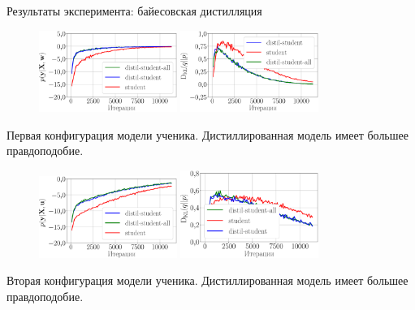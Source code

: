 \documentclass[10pt,pdf,hyperref={unicode}]{beamer}
\begin{document}
\begin{frame}{Результаты эксперимента: байесовская дистилляция}

\begin{figure}[h!]
\includegraphics[width=0.4\textwidth]{figures/synthetic_likelihood_3_layers.eps}
\includegraphics[width=0.4\textwidth]{figures/synthetic_D_KL_3_layers.eps}
\end{figure}
Первая конфигурация модели ученика. Дистиллированная модель имеет большее правдоподобие.

\begin{figure}[h!]
\includegraphics[width=0.4\textwidth]{figures/synthetic_likelihood_2_layers.eps}
\includegraphics[width=0.4\textwidth]{figures/synthetic_D_KL_2_layers.eps}
\end{figure}
Вторая конфигурация модели ученика. Дистиллированная модель имеет большее правдоподобие.

\end{frame}
\end{document}
